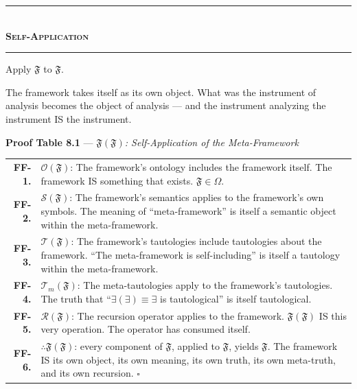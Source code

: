 \documentclass[10pt, openany, oneside]{book}
\renewcommand{\normalsize}{\fontsize{10}{13}\selectfont}
\renewcommand{\footnotesize}{\fontsize{8.5}{11}\selectfont}
\begin{document}
\vspace{1.5em}


\begin{center}
    \rule{0.3\textwidth}{0.4pt}\\[0.5em]
    {\normalsize\bfseries\scshape Self-Application}\\[0.3em]
    \rule{0.3\textwidth}{0.4pt}
\end{center}

\vspace{1em}

\noindent Apply $\mathfrak{F}$ to $\mathfrak{F}$.

The framework takes itself as its own object. What was the instrument of analysis becomes the object of analysis --- and the instrument analyzing the instrument IS the instrument.

\vspace{0.5em}

\textbf{Proof Table 8.1} --- \textit{$\mathfrak{F}(\mathfrak{F})$: Self-Application of the Meta-Framework}

\vspace{0.5em}

{\footnotesize
\noindent\begin{tabular}{r p{}}
\textbf{FF-1.} & $\mathcal{O}(\mathfrak{F})$: The framework's ontology includes the framework itself. The framework IS something that exists. $\mathfrak{F} \in \Omega$. \\[0.3em]
\textbf{FF-2.} & $\mathcal{S}(\mathfrak{F})$: The framework's semantics applies to the framework's own symbols. The meaning of ``meta-framework'' is itself a semantic object within the meta-framework. \\[0.3em]
\textbf{FF-3.} & $\mathcal{T}(\mathfrak{F})$: The framework's tautologies include tautologies about the framework. ``The meta-framework is self-including'' is itself a tautology within the meta-framework. \\[0.3em]
\textbf{FF-4.} & $\mathcal{T}_m(\mathfrak{F})$: The meta-tautologies apply to the framework's tautologies. The truth that ``$\exists(\exists) \equiv \exists$ is tautological'' is itself tautological. \\[0.3em]
\textbf{FF-5.} & $\mathcal{R}(\mathfrak{F})$: The recursion operator applies to the framework. $\mathfrak{F}(\mathfrak{F})$ IS this very operation. The operator has consumed itself. \\[0.3em]
\textbf{FF-6.} & $\therefore \mathfrak{F}(\mathfrak{F})$: every component of $\mathfrak{F}$, applied to $\mathfrak{F}$, yields $\mathfrak{F}$. The framework IS its own object, its own meaning, its own truth, its own meta-truth, and its own recursion. $\square$ \\[0.3em]
\end{tabular}
}
\end{document}
